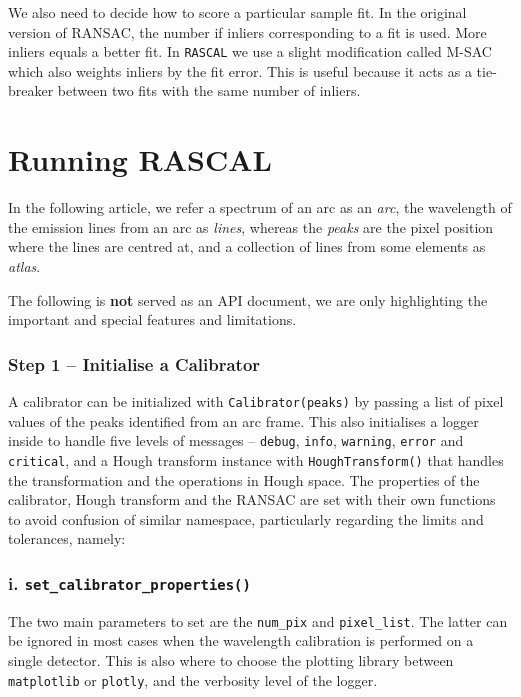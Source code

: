 \documentclass[fleqn,usenatbib]{rasti}
\begin{document}
We also need to decide how to score a particular sample fit. In the original
version of RANSAC, the number if inliers corresponding to a fit is used. More
inliers equals a better fit. In \texttt{RASCAL} we use a slight modification
called M-SAC~\citep{Torr00mlesac:a} which also weights inliers by the fit error.
This is useful because it acts as a tie-breaker between two fits with the
same number of inliers.

\section{Running RASCAL}
In the following article, we refer a spectrum of an arc as an \textit{arc},
the wavelength of the emission lines from an arc as \textit{lines}, whereas 
the \textit{peaks} are the pixel position where the lines are centred at,
and a collection of lines from some elements as \textit{atlas}.

The following is \textbf{not} served as an API document, we are only highlighting
the important and special features and limitations.

\subsubsection*{Step 1 -- Initialise a Calibrator}
A calibrator can be initialized with \texttt{Calibrator(peaks)} by passing a list
of pixel values of the peaks identified from an arc frame. This also
initialises a logger inside to handle five levels of messages -- \texttt{debug},
\texttt{info}, \texttt{warning}, \texttt{error} and \texttt{critical}, and a
Hough transform instance with \texttt{HoughTransform()} that handles the
transformation and the operations in Hough space. The properties of the
calibrator, Hough transform and the RANSAC are set with their own functions to
avoid confusion of similar namespace, particularly regarding the limits and
tolerances, namely:

\subsubsection*{i. \texttt{set\_calibrator\_properties()}}
The two main parameters to set are the \texttt{num\_pix} and \texttt{pixel\_list}.
The latter can be ignored in most cases when the wavelength calibration is performed
on a single detector. This is also where to choose the plotting library between
\texttt{matplotlib} or \texttt{plotly}, and the verbosity level of the logger.
\end{document}
